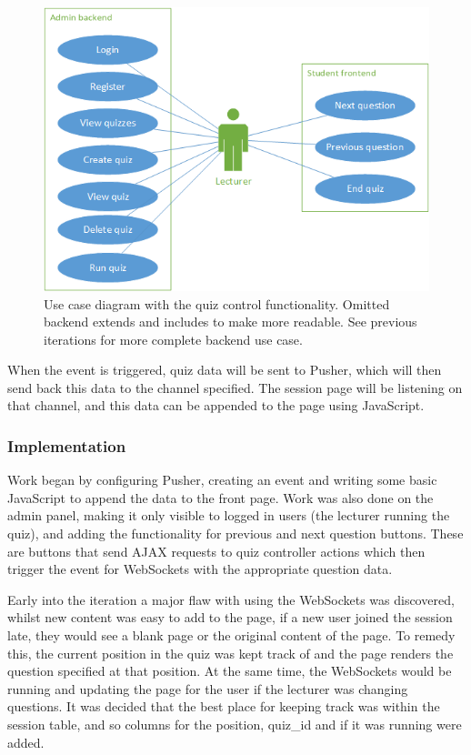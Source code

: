 \begin{figure}
	\caption{Use case diagram with the quiz control functionality. Omitted backend extends and includes to make more readable. See previous iterations for more complete backend use case.}
	\centerline{\includegraphics{Chapter2/Iter-4/iter-4-use-case}}
	\label{fig:iter-4-use-case}
\end{figure}

When the event is triggered, quiz data will be sent to Pusher, which will then send back this data to the channel specified. The session page will be listening on that channel, and this data can be appended to the page using JavaScript.

\subsubsection{Implementation}
Work began by configuring Pusher, creating an event and writing some basic JavaScript to append the data to the front page. Work was also done on the admin panel, making it only visible to logged in users (the lecturer running the quiz), and adding the functionality for previous and next question buttons. These are buttons that send AJAX requests to quiz controller actions which then trigger the event for WebSockets with the appropriate question data.

Early into the iteration a major flaw with using the WebSockets was discovered, whilst new content was easy to add to the page, if a new user joined the session late, they would see a blank page or the original content of the page. To remedy this, the current position in the quiz was kept track of and the page renders the question specified at that position. At the same time, the WebSockets would be running and updating the page for the user if the lecturer was changing questions. It was decided that the best place for keeping track was within the session table, and so columns for the position, quiz\_id and if it was running were added.

